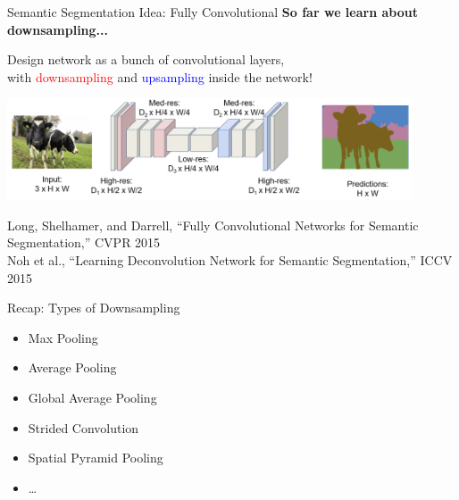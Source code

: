 \documentclass[serif, aspectratio=169]{beamer}
\begin{document}
\begin{frame}{Semantic Segmentation Idea: Fully Convolutional}
    \textcolor{deepgreen}{\textbf{So far we learn about downsampling...}}

    \begin{center}
        \vspace{0.3cm}
        Design network as a bunch of convolutional layers, \\
        with \textcolor{red}{downsampling} and \textcolor{blue}{upsampling} inside the network!
    \end{center}
    
    \begin{center}
        \includegraphics[width=0.9\textwidth]{pic/SS fully conv2.png}
    \end{center}
    
    \vspace{0.5cm}
    
    \scriptsize{
    Long, Shelhamer, and Darrell, “Fully Convolutional Networks for Semantic Segmentation,” CVPR 2015 \\
    Noh et al., “Learning Deconvolution Network for Semantic Segmentation,” ICCV 2015
    }
\end{frame}

\begin{frame}{Recap: Types of Downsampling}
    \begin{itemize}
        \item Max Pooling
        \item Average Pooling
        \item Global Average Pooling
        \item Strided Convolution
        \item Spatial Pyramid Pooling
        \item \ldots
    \end{itemize}
\end{frame}
\end{document}
